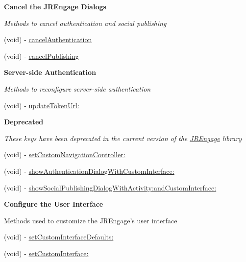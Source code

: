 \begin{Indent}{\bf Cancel the JREngage Dialogs}\par
{\em \label{_amgrpd07ee85d05cc5dd13dd0e31682479a39}
 Methods to cancel authentication and social publishing }\begin{DoxyCompactItemize}
\item 
(void) -\/ \hyperlink{class_j_r_engage_a17b67c9bb98230fb7d59f8c35a20662b}{cancelAuthentication}
\item 
(void) -\/ \hyperlink{class_j_r_engage_a205c368338061976178a5b0e36f2d4f2}{cancelPublishing}
\end{DoxyCompactItemize}
\end{Indent}
\begin{Indent}{\bf Server-\/side Authentication}\par
{\em \label{_amgrp1fc6cae7bdf84f91a0bad45f5891f15e}
 Methods to reconfigure server-\/side authentication }\begin{DoxyCompactItemize}
\item 
(void) -\/ \hyperlink{class_j_r_engage_ac0fb45ee43767dfdea0057bb93000db6}{updateTokenUrl:}
\end{DoxyCompactItemize}
\end{Indent}
\begin{Indent}{\bf Deprecated}\par
{\em \label{_amgrp0ac54cb10e7494cff1949826e8e32f7b}
 These keys have been deprecated in the current version of the \hyperlink{class_j_r_engage}{JREngage} library }\begin{DoxyCompactItemize}
\item 
(void) -\/ \hyperlink{class_j_r_engage_a6c704bbff377d20603e6b52bd0ae17f1}{setCustomNavigationController:}
\item 
(void) -\/ \hyperlink{class_j_r_engage_ac8e1206be8608fbed548b7ec5f85e6e6}{showAuthenticationDialogWithCustomInterface:}
\item 
(void) -\/ \hyperlink{class_j_r_engage_af5c2aa40f5c45a22f369900d1bd81953}{showSocialPublishingDialogWithActivity:andCustomInterface:}
\end{DoxyCompactItemize}
\end{Indent}
\begin{Indent}{\bf Configure the User Interface}\par
{\em \label{_amgrp94e7ef441fcaa606cadd8cfd8b428e50}
 \label{interface_j_r_engage_07_custom_interface_08_customInterface}
\hypertarget{interface_j_r_engage_07_custom_interface_08_customInterface}{}


Methods used to customize the JREngage's user interface }\begin{DoxyCompactItemize}
\item 
(void) -\/ \hyperlink{class_j_r_engage_ab62496ba7cbc32e0a4f7d91c992c7ca2}{setCustomInterfaceDefaults:}
\item 
(void) -\/ \hyperlink{class_j_r_engage_ae9cce08f42f575bc49329b363af5c531}{setCustomInterface:}
\end{DoxyCompactItemize}
\end{Indent}


